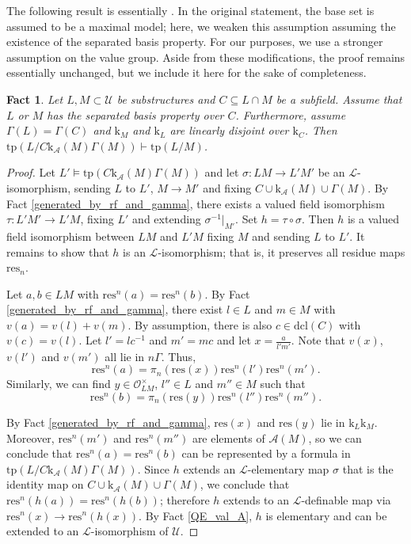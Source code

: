 \documentclass[12pt]{article}
\newcommand{\tpp}{\mathrm{tp}}
\newcommand{\res}{\mathrm{res}}
\newcommand{\dcl}{\mathrm{dcl}}
\newcommand{\val}{\textit{v}}
\newcommand{\0}{\emptyset}
\newcommand{\vg}{\Gamma}
\newcommand{\rf}{\mathrm{k}}
\newcommand{\A}{\mathcal{A}}
\newcommand{\U}{\mathcal{U}}
\theoremstyle{plain}%
\newtheorem{fact}[thm]{Fact}
\theoremstyle{definition}
\theoremstyle{remark}
\begin{document}
The following result is essentially \cite[Theorem 3.8]{Vic22}. In the original statement, the base set is assumed to be a maximal model; here, we weaken this assumption assuming the existence of the separated basis property. For our purposes, we use a stronger assumption on the value group. Aside from these modifications, the proof remains essentially unchanged, but we include it here for the sake of completeness.

\begin{fact}\label{predomination_residual_domination}
    Let $L,M\subset \U$ be substructures and $C\subseteq L\cap M$ be a subfield. Assume that $L$ or $M$ has the separated basis property over $C$. Furthermore, assume $\vg(L)=\vg(C)$ and $\rf_M$ and $\rf_L$ are linearly disjoint over $\rf_C$. Then $\tpp(L/C \rf_{\mathcal{A}}(M) \vg(M))\vdash \tpp(L/M)$.
\end{fact}
\begin{proof}
   Let $L'\models \tpp(C\rf_{\A}(M)\Gamma(M))$ and let $\sigma: LM \to L'M'$ be an $\mathcal{L}$-isomorphism, sending $L$ to $L'$, $M\to M'$ and fixing $C\cup \rf_{\A}(M)\cup\Gamma(M)$. 
   By Fact \ref{generated_by_rf_and_gamma}, there exists a valued field isomorphism $\tau: L'M'\to L'M$, fixing $L'$ and extending $\sigma^{-1}|_{M'}$. Set  $h=\tau\circ \sigma$. Then $h$ is a valued field isomorphism between $LM$ and $L'M$ fixing $M$ and sending $L$ to $L'$. It remains to show that $h$ is an $\mathcal{L}$-isomorphism; that is, it preserves all residue maps $\res_n$.

   Let $a,b\in LM$ with $\res^n(a)=\res^n(b)$. By Fact \ref{generated_by_rf_and_gamma}, there exist $l\in L$ and $m\in M$ with $\val(a)=\val(l)+\val(m)$. By assumption, there is also $c\in \dcl(C)$ with $\val(c)=\val(l)$. 
   Let $l'=lc^{-1}$ and $m'=mc$ and let $x=\frac{a}{l'm'}$. Note that $\val(x)$, $\val(l')$ and $\val(m')$ all lie in $n\Gamma$. Thus, $$\res^n(a)=\pi_n(\res(x))\res^{n}(l')\res^n(m').$$
   Similarly, we can find $y\in \mathcal{O}_{LM}^{\times}$, $l''\in L$ and $m''\in M$ such that $$\res^n(b)=\pi_n(\res(y))\res^n(l'')\res^n(m'').$$
   
By Fact \ref{generated_by_rf_and_gamma}, $\res(x)$ and $\res(y)$ lie in $\rf_L\rf_M$. Moreover, $\res^n(m')$ and $\res^n(m'')$ are elements of $\A(M)$, so we can conclude that $\res^n(a)=\res^n(b)$ can be represented by a formula in $\tpp(L/C\rf_{\A}(M)\Gamma(M))$. 
Since $h$ extends an $\mathcal{L}$-elementary map $\sigma$ that is the identity map on $C\cup \rf_{\A}(M)\cup \Gamma(M)$, we conclude that $\res^n(h(a))=\res^n(h(b))$; therefore $h$ extends to an $\mathcal{L}$-definable map via $\res^n(x)\to \res^n(h(x))$. By Fact \ref{QE_val_A}, $h$ is elementary and can be extended to an $\mathcal{L}$-isomorphism of $\U$.\end{proof}
\end{document}
